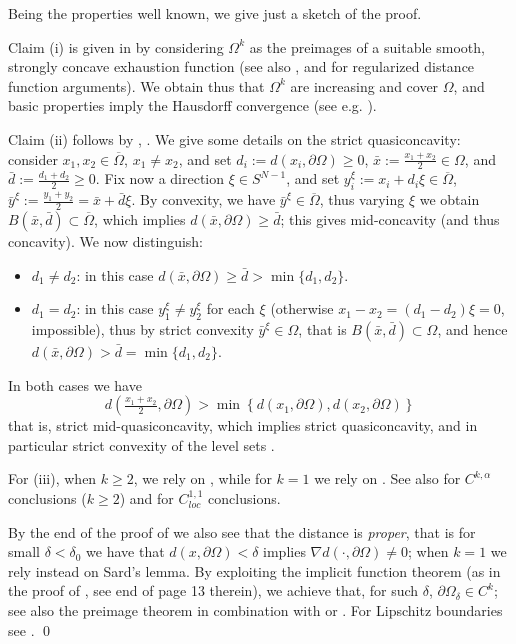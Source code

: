 \documentclass[11pt, reqno]{amsart}
\theoremstyle{definition}
\numberwithin{equation}{section}
\renewenvironment{proof}[1][\proofname]{\medskip \noindent {\bfseries #1. }}{\qed \bigskip}
\begin{document}
\begin{proof}
Being the properties well known, we give just a sketch of the proof. 

Claim (i) is given in \cite[Corollary 6.3.10]{KrPa99} by considering $\Omega^k$ as the preimages of a suitable smooth, strongly concave exhaustion function (see also \cite[Theorem 2.3]{Blo97}, and \cite[Theorem 1.4]{Lie85} for regularized distance function arguments).
We obtain thus that $\Omega^k$ are increasing and cover $\Omega$, and basic properties imply the Hausdorff convergence (see e.g. \cite[Section 2.2.3.2]{HePi18}).

Claim (ii) follows by \cite[Theorem 2.1.24]{Hor94}, \cite[Theorem 5.4]{DeZo94}. 
We give some details on the strict quasiconcavity: consider $x_1, x_2 \in \overline{\Omega}$, $x_1 \neq x_2$, and set $d_i:=d(x_i, \partial \Omega)\geq 0$, $\bar{x}:= \frac{x_1+x_2}{2} \in \Omega$, and $\bar{d}:=\frac{d_1+d_2}{2}\geq 0$. Fix now a direction $\xi \in S^{N-1}$, and set $y_i^{\xi}:= x_i + d_i \xi \in \overline{\Omega}$, $\bar{y}^{\xi}:=\frac{y_1+y_2}{2} =\bar{x} + \bar{d}\xi$. 
By convexity, we have $\bar{y}^{\xi} \in \overline{\Omega}$, thus varying $\xi$ we obtain $B(\bar{x}, \bar{d}) \subset \overline{\Omega}$, which implies $d(\bar{x}, \partial \Omega) \geq \bar{d}$; this gives mid-concavity (and thus concavity). We now distinguish:
\begin{itemize}
\item $d_1 \neq d_2$: in this case $d(\bar{x}, \partial \Omega) \geq \bar{d} > \min\{d_1,d_2\}$.
\item $d_1 = d_2$: in this case $y_1^{\xi} \neq y_2^{\xi}$ for each $\xi$ (otherwise $x_1 - x_2 = (d_1 - d_2) \xi = 0$, impossible), thus by strict convexity $\bar{y}^{\xi} \in \Omega$, that is $B(\bar{x}, \bar{d}) \subset \Omega$,
and hence $d(\bar{x}, \partial \Omega) > \bar{d} = \min\{d_1,d_2\}$.
\end{itemize}
In both cases we have 
$$d\left(\tfrac{x_1+x_2}{2}, \partial \Omega\right) > \min\left\{d(x_1,\partial \Omega), d(x_2, \partial \Omega)\right\}$$
that is, strict mid-quasiconcavity, which implies strict quasiconcavity, and in particular strict convexity of the level sets \cite[Corollary 3.36]{ADSZ10}.

For (iii), when $k \geq 2$, we rely on \cite[Lemma 14.16]{GiTr01}, while for $k=1$ we rely on \cite{Foo84}. 
See also \cite{KrPa81} for $C^{k,\alpha}$ conclusions ($k\geq 2$) and \cite[Theorem 5.7]{DeZo94} for $C^{1,1}_{loc}$ conclusions.


By the end of the proof of \cite[Lemma 14.16]{GiTr01} we also see that the distance is \emph{proper}, that is for small $\delta <\delta_0 $ we have that $d(x,\partial \Omega) < \delta$ implies $\nabla d(\cdot, \partial \Omega) \neq 0$; 
when $k=1$ we rely instead on Sard's lemma.
By exploiting the implicit function theorem (as in the proof of \cite[Theorem 5.1]{BaZa17}, see end of page 13 therein), we achieve that, for such $\delta$, $\partial \Omega_{\delta} \in C^k$; 
see also the preimage theorem \cite[Corollary in Section 1.2.2, page 37]{Maz11} in combination with \cite[Theorem 1.2.1.5]{Gri11} or \cite[Section 1.2]{KrPa99}. 
For Lipschitz boundaries see \cite[Theorem 4.1]{Dok76}. 
\end{proof}
\end{document}
